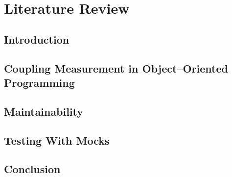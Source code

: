 \chapter{Literature Review}

\section{Introduction}

\section{Coupling Measurement in Object--Oriented Programming}

\section{Maintainability}

\section{Testing With Mocks}

\section{Conclusion}